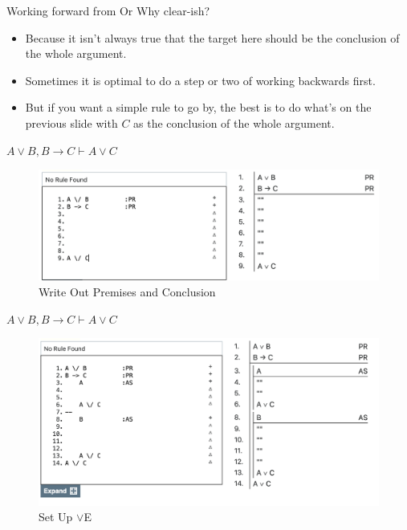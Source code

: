 \documentclass[
  ignorenonframetext,
]{beamer}
\providecommand{\tightlist}{%
  \setlength{\itemsep}{0pt}\setlength{\parskip}{0pt}}
\renewcommand{\,}{\text{, }}
\begin{document}
\begin{frame}{Working forward from Or}
\protect\hypertarget{working-forward-from-or-1}{}
Why clear-ish?

\begin{itemize}
\tightlist
\item
  Because it isn't always true that the target here should be the
  conclusion of the whole argument.
\item
  Sometimes it is optimal to do a step or two of working backwards
  first.
\item
  But if you want a simple rule to go by, the best is to do what's on
  the previous slide with \(C\) as the conclusion of the whole argument.
\end{itemize}
\end{frame}

\begin{frame}{\(A \vee B, B \rightarrow C \vdash A \vee C\)}
\protect\hypertarget{a-vee-b-b-rightarrow-c-vdash-a-vee-c}{}
\begin{figure}
\centering
\includegraphics[width=\textwidth,height=0.75\textheight]{5_5a.png}
\caption{Write Out Premises and Conclusion}
\end{figure}
\end{frame}

\begin{frame}{\(A \vee B, B \rightarrow C \vdash A \vee C\)}
\protect\hypertarget{a-vee-b-b-rightarrow-c-vdash-a-vee-c-1}{}
\begin{figure}
\centering
\includegraphics[width=\textwidth,height=0.75\textheight]{5_5b.png}
\caption{Set Up \(\vee\)E}
\end{figure}
\end{frame}
\end{document}
